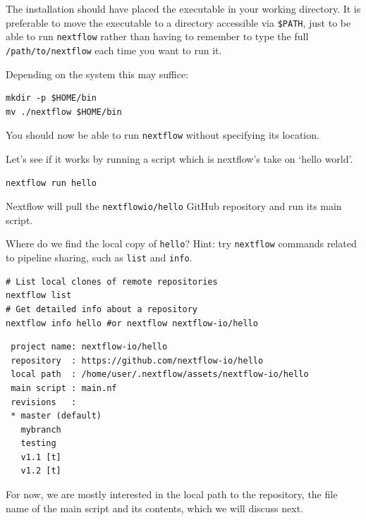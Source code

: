 The installation should have placed the executable in your working directory.
It is preferable to move the executable to a directory accessible via \texttt{\$PATH}, 
just to be able to run \texttt{nextflow} rather than having to remember 
to type the full \texttt{/path/to/nextflow} each time you want to run it.

Depending on the system this may suffice:

\begin{steps}
\begin{lstlisting}
mkdir -p $HOME/bin
mv ./nextflow $HOME/bin
\end{lstlisting}
\end{steps}

You should now be able to run \texttt{nextflow} without specifying its location.

Let's see if it works by running a script which is nextflow's take on `hello world'.

\begin{steps}
\begin{lstlisting}
nextflow run hello
\end{lstlisting}
\end{steps}

Nextflow will pull the \texttt{nextflowio/hello} GitHub repository and run its main script.


\begin{questions}
Where do we find the local copy of \texttt{hello}? Hint: try \texttt{nextflow} commands related to pipeline sharing, such as \texttt{list} and \texttt{info}.
\begin{answer}
\begin{lstlisting}
# List local clones of remote repositories
nextflow list
# Get detailed info about a repository 
nextflow info hello #or nextflow nextflow-io/hello
\end{lstlisting}

\begin{verbatim}
 project name: nextflow-io/hello
 repository  : https://github.com/nextflow-io/hello
 local path  : /home/user/.nextflow/assets/nextflow-io/hello
 main script : main.nf
 revisions   : 
 * master (default)
   mybranch
   testing
   v1.1 [t]
   v1.2 [t]
\end{verbatim}
\end{answer}
\end{questions}


For now, we are mostly interested in the local path to the repository, the file name of the main script 
and its contents, which we will discuss next.



